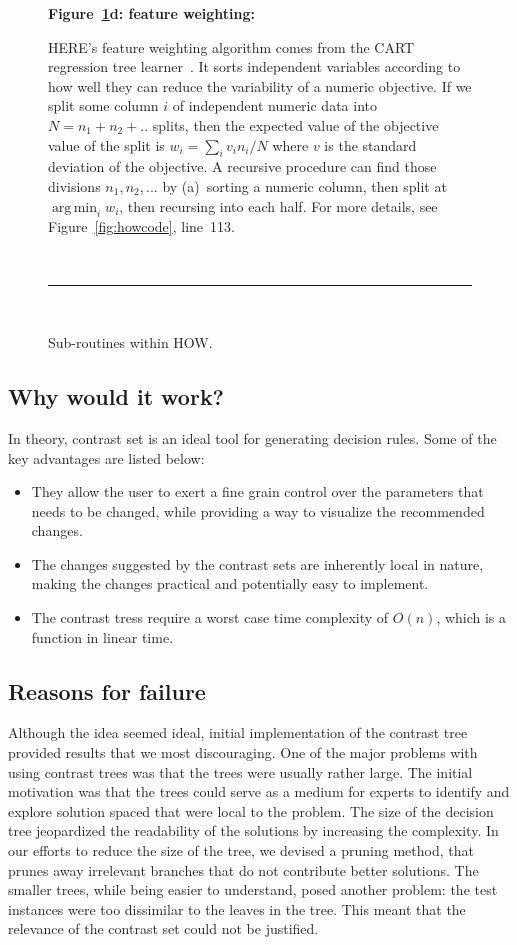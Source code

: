 \documentclass[conference]{IEEEtran}
\newcommand{\fig}[1]{Figure~\ref{fig:#1}}
\DeclareMathOperator*{\argmin}{arg\,min}
\begin{document}
\begin{figure}[t]
    {\bf \fig{where}d: feature weighting:}
    
    HERE's feature weighting algorithm
    comes from the CART regression tree learner~\cite{Breiman1984}.
    It sorts independent variables
    according to how well they can reduce the variability
    of a  numeric objective.
    If we split some column $i$ of independent numeric data  into $N=n_1 + n_2 + ..$ splits,
    then the expected
    value of the objective value of the split  is $w_i = \sum_i v_in_i/N$
    where $v$ is the standard deviation of the objective.
    A recursive procedure can  find those divisions $n_1,n_2,...$ by (a)~sorting a numeric column,
    then split at $\argmin_i w_i$, then recursing into each half.  For more details, see  \fig{howcode}, line~113.
    
    ~\hrule~
    
    \caption{Sub-routines within HOW.}\label{fig:where}
\end{figure}

\subsection{Why would it work?}
In theory, contrast set is an ideal tool for generating decision rules. Some of the key advantages are listed below:
\begin{itemize}
\item They allow the user to exert a fine grain control over the parameters that needs to be changed, while providing a way to visualize the recommended changes.
\item The changes suggested by the contrast sets are inherently local in nature, making the changes practical and potentially easy to implement.
\item The contrast tress require a worst case time complexity of $O(n)$, which is a function in linear time.
\end{itemize}
\subsection{Reasons for failure}
Although the idea seemed ideal, initial implementation of the contrast tree provided results that we most discouraging. One of the major problems with using contrast trees was that the trees were usually rather large. The initial motivation was that the trees could serve as a medium for experts to identify and explore solution spaced that were local to the problem. The size of the decision tree jeopardized the readability of the solutions by increasing the complexity. In our efforts to reduce the size of the tree, we devised a pruning method, that prunes away irrelevant branches that do not contribute better solutions. The smaller trees, while being easier to understand, posed another problem: the test instances were too dissimilar to the leaves in the tree. This meant that the relevance of the contrast set could not be justified.
\end{document}
